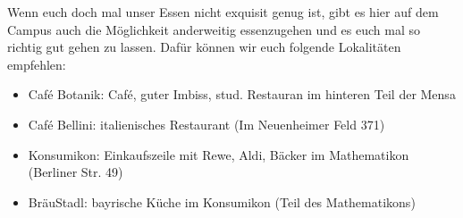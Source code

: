   Wenn euch doch mal unser Essen nicht exquisit genug ist, gibt es hier auf dem Campus auch die Möglichkeit
  anderweitig essenzugehen und es euch mal so richtig gut gehen zu lassen. Dafür können wir euch
  folgende Lokalitäten empfehlen:
  \begin{itemize}
  \item Café Botanik: Café, guter Imbiss, stud. Restauran im hinteren Teil der Mensa
  \item Café Bellini: italienisches Restaurant (Im Neuenheimer Feld 371)
  \item Konsumikon: Einkaufszeile mit Rewe, Aldi, Bäcker im Mathematikon (Berliner Str. 49)
  \item BräuStadl: bayrische Küche im Konsumikon (Teil des Mathematikons)
  \end{itemize}
